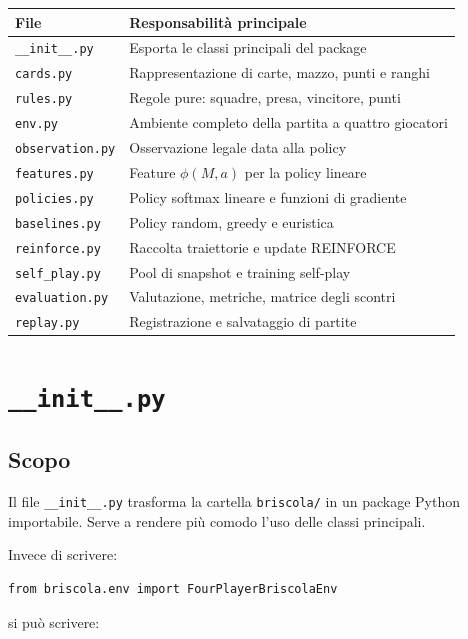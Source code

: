 \documentclass[11pt,a4paper]{article}
\begin{document}
\begin{center}
\begin{tabular}{ll}
\toprule
File & Responsabilità principale \\
\midrule
\texttt{\_\_init\_\_.py} & Esporta le classi principali del package \\
\texttt{cards.py} & Rappresentazione di carte, mazzo, punti e ranghi \\
\texttt{rules.py} & Regole pure: squadre, presa, vincitore, punti \\
\texttt{env.py} & Ambiente completo della partita a quattro giocatori \\
\texttt{observation.py} & Osservazione legale data alla policy \\
\texttt{features.py} & Feature $\phi(M,a)$ per la policy lineare \\
\texttt{policies.py} & Policy softmax lineare e funzioni di gradiente \\
\texttt{baselines.py} & Policy random, greedy e euristica \\
\texttt{reinforce.py} & Raccolta traiettorie e update REINFORCE \\
\texttt{self\_play.py} & Pool di snapshot e training self-play \\
\texttt{evaluation.py} & Valutazione, metriche, matrice degli scontri \\
\texttt{replay.py} & Registrazione e salvataggio di partite \\
\bottomrule
\end{tabular}
\end{center}

\section{\texttt{\_\_init\_\_.py}}

\subsection{Scopo}

Il file \texttt{\_\_init\_\_.py} trasforma la cartella \texttt{briscola/} in un
package Python importabile. Serve a rendere più comodo l'uso delle classi
principali.

Invece di scrivere:

\begin{verbatim}
from briscola.env import FourPlayerBriscolaEnv
\end{verbatim}

si può scrivere:
\end{document}

